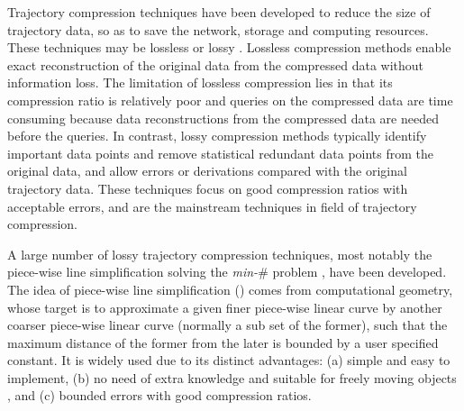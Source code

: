 Trajectory compression techniques \cite{Douglas:Peucker, Hershberger:Speeding, Meratnia:Spatiotemporal, Liu:BQS, Muckell:Compression, Chen:Trajectory, Chen:Fast, Keogh:online, Cao:Spatio, Shi:Survey, Richter:Semantic ,Long:Direction, Song:PRESS, Nibali:Trajic} have been developed to reduce the size of trajectory data, so as to save the network, storage and computing resources.
%
%
%
%
These techniques may be lossless or lossy \cite{Muckell:Compression}.
Lossless compression methods enable exact reconstruction of the original data from the compressed data without information loss.
The limitation of lossless compression lies in that its compression ratio is relatively poor \cite{Nibali:Trajic} and {queries on the compressed data are time consuming because data reconstructions from the compressed data are needed before the queries}.
%
In contrast, lossy compression methods typically identify important data points and remove statistical redundant data points from the original data, and allow errors or derivations compared with the original trajectory data.
These techniques focus on good compression ratios with acceptable errors, and are the mainstream techniques in field of trajectory compression.

A large number of lossy trajectory compression techniques, most notably the piece-wise line simplification \cite{Douglas:Peucker, Hershberger:Speeding, Keogh:online,Liu:BQS, Muckell:Compression, Chen:Trajectory, Chen:Fast, Cao:Spatio, Shi:Survey} solving the \emph{min-$\#$} problem \cite{Chan:Optimal, Imai:Optimal,Pavlidis:Segment}, have been developed. The idea of piece-wise line simplification (\lsa) comes from computational geometry, whose target is to approximate a given finer piece-wise linear curve by another coarser piece-wise linear curve ({normally} a sub set of the former), such that the maximum distance of the former from the later is bounded by a user specified constant. It is widely used due to its distinct advantages: (a) simple and easy to implement, (b) no need of extra knowledge and suitable for freely  moving  objects \cite{Popa:Spatio}, and (c) bounded errors with good compression ratios.

